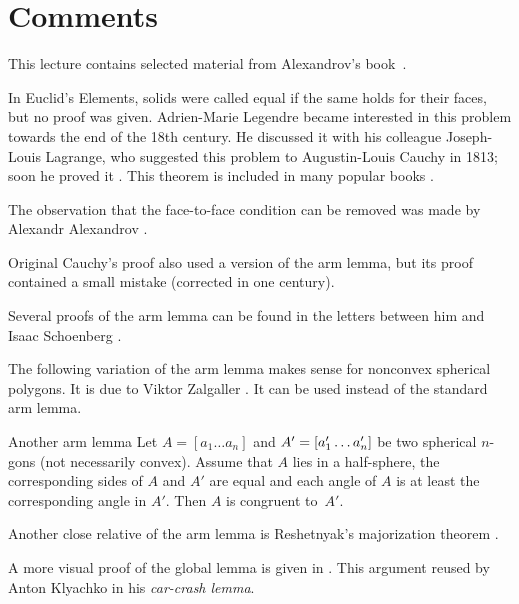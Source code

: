 \section{Comments}

This lecture contains selected material from Alexandrov's book~\cite{alexandrov}.

In Euclid's Elements, 
solids were called equal if the same holds for their faces, but no proof was given.
Adrien-Marie Legendre became interested in this problem towards the end of the 18th century.
He discussed it with his colleague Joseph-Louis Lagrange, who suggested this problem to Augustin-Louis Cauchy in 1813; soon he proved it \cite{cauchy}.
This theorem is included in many popular books \cite{aigner-zigler,dolbilin,tabacnikov-fuks}.

The observation that the face-to-face condition can be removed was made by 
Alexandr Alexandrov \cite{alexandrov-1941}.

Original Cauchy's proof \cite{cauchy}
also used a version of the arm lemma, but its proof contained a small mistake (corrected in one century).

Several proofs of the arm lemma can be found in the letters between him and Isaac Schoenberg \cite{schoenberg-zaremba}.

The following variation of the arm lemma makes sense for nonconvex spherical polygons.
It is due to Viktor Zalgaller \cite{zalgaller}.
It can be used instead of the standard arm lemma.

\begin{thm}{Another arm lemma}
Let $A=[a_1\dots a_n]$ and $A'=[a'_1\dots a'_n]$ be two spherical $n$-gons (not necessarily convex).
Assume that $A$ lies in a half-sphere,
the corresponding sides of $A$ and $A'$ are equal
and each angle of $A$ is at least the corresponding angle in $A'$.
Then $A$ is congruent to~$A'$. 
\end{thm}

Another close relative of the arm lemma is Reshetnyak's majorization theorem \cite{alexander-kapovitch-petrunin-2019}.

A more visual proof of the global lemma is given in \cite[II \S 1.3]{alexandrov}.
This argument reused by Anton Klyachko \cite{klyachko} in his \emph{car-crash lemma}.
